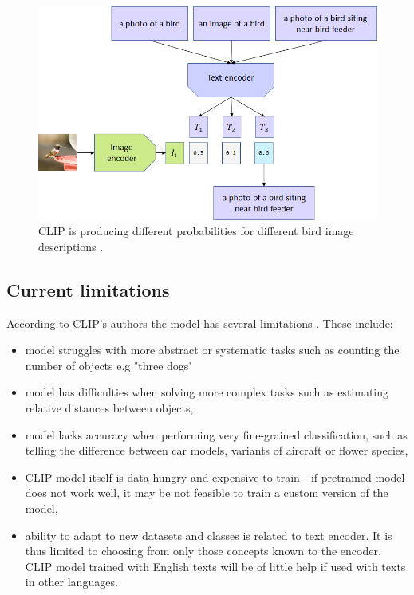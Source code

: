 \documentclass[12pt,a4paper,openany]{book}
\begin{document}
 \begin{figure}[ht!]
     \centering
     \includegraphics[scale=0.5]{figs/clip_model_3.png}
     \caption{CLIP is producing different probabilities for different bird image descriptions \cite{clip_source}.}
 \end{figure}
 \newpage
 \subsection*{Current limitations}
\noindent According to CLIP's authors the model has several limitations \cite{clip_blog}. These include:
\begin{itemize}
\item model struggles with more abstract or systematic tasks such as counting the number of objects e.g "three dogs"
\item model has difficulties when solving more complex tasks such as estimating relative distances between objects,
\item  model lacks accuracy when performing very fine-grained classification, such as telling the difference between car models, variants of aircraft or flower species,
\item CLIP model itself is data hungry and expensive to train - if pretrained model does not work well, it may be not feasible to train a custom version of the model,
\item ability to adapt to new datasets and classes is related to text encoder. It is thus limited to choosing from only those concepts known to the encoder. CLIP model trained with English texts will be of little help if used with texts in other languages. \\
\end{itemize}
\end{document}
